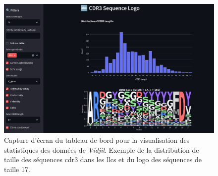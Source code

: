 \begin{figure}[H]
    \centering
    \includegraphics[width=1\textwidth]{images/vidjil_stat.png}
    \caption{
        Capture d'écran du tableau de bord pour la visualisation des statistiques des données de \textit{Vidjil}. 
        Exemple de la distribution de taille des séquences \gls{cdr}3 dans les \glspl{llc} et du logo des séquences 
        de taille 17.
        }
    \label{fig:vidjil-stat}
\end{figure}